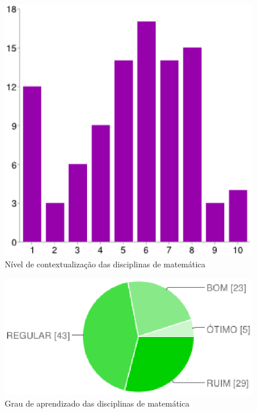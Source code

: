 \documentclass[12pt,a4paper]{article}
\begin{document}
\begin{figure}[htb]
	\center
	\includegraphics[scale=0.36]{imagens/5.eps} 
	\caption{Nível de contextualização das disciplinas de matemática}
	\label{fig:grafContextualizacao}
\end{figure}

\begin{figure}[htb]
	\center
	\includegraphics[scale=0.75]{imagens/6.eps} 
	\caption{Grau de aprendizado das disciplinas de matemática}
	\label{fig:grafAprendizado}
\end{figure}
\end{document}
